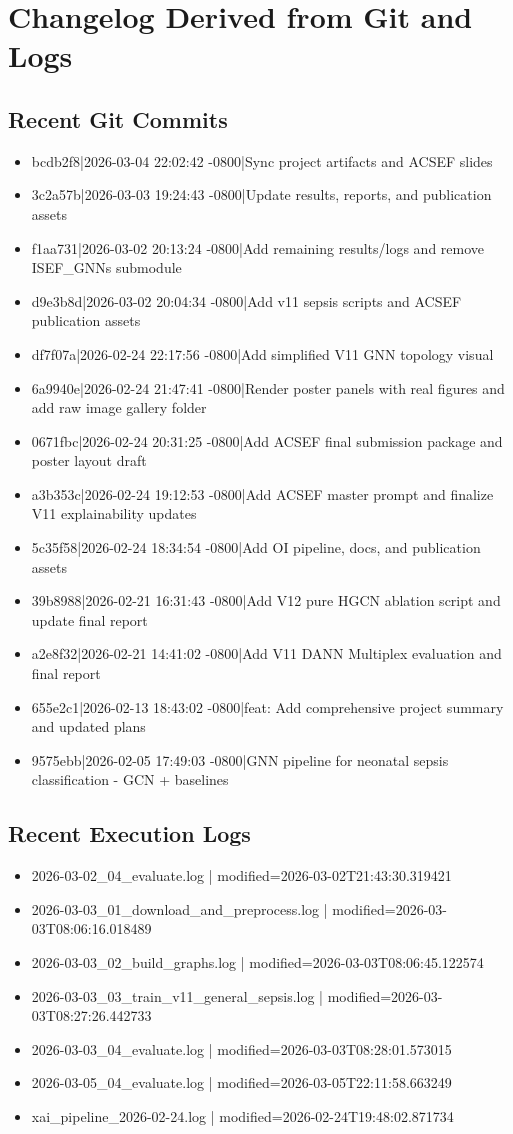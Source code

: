 \documentclass[11pt]{article}
\begin{document}
\section{Changelog Derived from Git and Logs}
\subsection{Recent Git Commits}
\begin{itemize}
\item bcdb2f8|2026-03-04 22:02:42 -0800|Sync project artifacts and ACSEF slides
\item 3c2a57b|2026-03-03 19:24:43 -0800|Update results, reports, and publication assets
\item f1aa731|2026-03-02 20:13:24 -0800|Add remaining results/logs and remove ISEF\_GNNs submodule
\item d9e3b8d|2026-03-02 20:04:34 -0800|Add v11 sepsis scripts and ACSEF publication assets
\item df7f07a|2026-02-24 22:17:56 -0800|Add simplified V11 GNN topology visual
\item 6a9940e|2026-02-24 21:47:41 -0800|Render poster panels with real figures and add raw image gallery folder
\item 0671fbc|2026-02-24 20:31:25 -0800|Add ACSEF final submission package and poster layout draft
\item a3b353c|2026-02-24 19:12:53 -0800|Add ACSEF master prompt and finalize V11 explainability updates
\item 5c35f58|2026-02-24 18:34:54 -0800|Add OI pipeline, docs, and publication assets
\item 39b8988|2026-02-21 16:31:43 -0800|Add V12 pure HGCN ablation script and update final report
\item a2e8f32|2026-02-21 14:41:02 -0800|Add V11 DANN Multiplex evaluation and final report
\item 655e2c1|2026-02-13 18:43:02 -0800|feat: Add comprehensive project summary and updated plans
\item 9575ebb|2026-02-05 17:49:03 -0800|GNN pipeline for neonatal sepsis classification - GCN + baselines
\end{itemize}
\subsection{Recent Execution Logs}
\begin{itemize}
\item 2026-03-02\_04\_evaluate.log | modified=2026-03-02T21:43:30.319421
\item 2026-03-03\_01\_download\_and\_preprocess.log | modified=2026-03-03T08:06:16.018489
\item 2026-03-03\_02\_build\_graphs.log | modified=2026-03-03T08:06:45.122574
\item 2026-03-03\_03\_train\_v11\_general\_sepsis.log | modified=2026-03-03T08:27:26.442733
\item 2026-03-03\_04\_evaluate.log | modified=2026-03-03T08:28:01.573015
\item 2026-03-05\_04\_evaluate.log | modified=2026-03-05T22:11:58.663249
\item xai\_pipeline\_2026-02-24.log | modified=2026-02-24T19:48:02.871734
\end{itemize}
\end{document}
